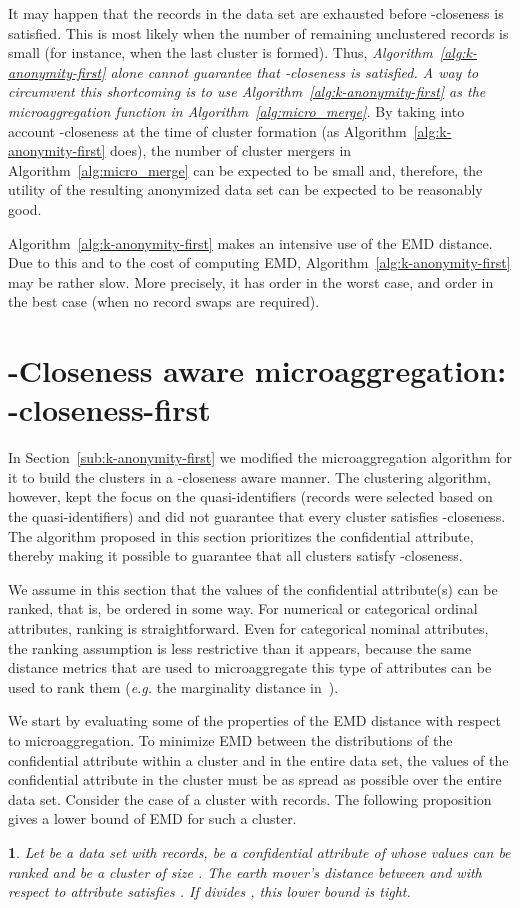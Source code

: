 \documentclass[10pt,journal,compsoc]{IEEEtran}
\theoremstyle{definition}
\theoremstyle{plain}
\newtheorem{prop}{\protect\propositionname}
\providecommand{\propositionname}{Proposition}
\begin{document}
It may happen that the records in 
the data set are exhausted before -closeness
is satisfied. This is most likely when the number of remaining
unclustered records is small (for instance, when the last cluster
is formed). 
Thus, {\em Algorithm~\ref{alg:k-anonymity-first} alone
cannot guarantee that -closeness is satisfied.
A way to circumvent this shortcoming is 
to use Algorithm~\ref{alg:k-anonymity-first}
as the microaggregation function in Algorithm~\ref{alg:micro_merge}.}
By taking into account -closeness at the time 
of cluster formation (as Algorithm~\ref{alg:k-anonymity-first} does),
the number of cluster mergers in Algorithm~\ref{alg:micro_merge} 
can be expected to be small and, therefore, the utility 
of the resulting anonymized data set can be expected to be reasonably
good.

Algorithm~\ref{alg:k-anonymity-first} makes an intensive use of the EMD distance.
Due to this and to the cost of computing EMD, 
Algorithm~\ref{alg:k-anonymity-first}
may be rather slow. More precisely, it has order  in 
the worst case, and order
 in the best case (when no record swaps are required).

\section{-Closeness aware microaggregation: -closeness-first\label{sub:t-closeness-first}}

In Section~\ref{sub:k-anonymity-first} we modified the microaggregation
algorithm for it to build the clusters in a -closeness aware manner.
The clustering algorithm, however, kept the focus on the quasi-identifiers
(records were selected based on the quasi-identifiers) and did not
guarantee that every cluster satisfies -closeness. The algorithm 
proposed in this section prioritizes the confidential
attribute, thereby making it possible to guarantee that all clusters
satisfy -closeness.

We assume in this section that the values of the confidential attribute(s)
can be ranked, that is, be ordered in some
way. For numerical or categorical ordinal attributes, 
ranking is straightforward. Even for categorical nominal
attributes, the ranking assumption is less restrictive
than it appears, because
the same distance metrics that are used to microaggregate
this type of attributes  
can be used to rank them ({\em e.g.} 
the marginality distance in~\cite{Domingo13,SoriaVLDB14}).

We start by evaluating some of the properties of the EMD distance with respect
to microaggregation. To minimize EMD between 
the distributions of the confidential attribute within a cluster 
and in the entire data set,
the values of the confidential attribute in the cluster must be as
spread as possible over the entire data set. Consider the case of
a cluster with  records. The following proposition gives 
a lower bound of EMD for such a cluster.
\begin{prop}
	\label{prop:min}Let  be a data set with  records, 
be a confidential attribute of  whose values can be ranked 
and  be a cluster of size .
	The earth mover's distance between  and  
with respect to  
	attribute  satisfies 
.
If  divides , this lower bound is tight.\end{prop}
\end{document}
